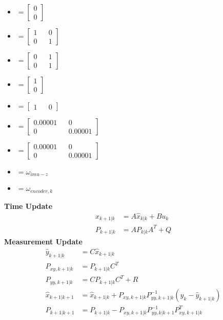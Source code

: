 \documentclass[12pt,a4paper]{article}
\begin{document}
	\begin{itemize}
		\item { 
			\(= \begin{bmatrix}
				0 \\
				0
			\end{bmatrix}\)}
		\item {
			\(= \begin{bmatrix}
				1 && 0\\
				0 && 1
			\end{bmatrix}\)}
		\item { 
			\(= \begin{bmatrix}
				0 && 1\\
				0 && 1
			\end{bmatrix}\)}
		\item { 
			\(= \begin{bmatrix}
				1\\
				0
			\end{bmatrix}\)}
		\item { 
			\(= \begin{bmatrix}
				1 && 0
			\end{bmatrix}\)}
		\item { 
			\(= \begin{bmatrix}
				0.00001 && 0 \\
				0 && 0.00001
			\end{bmatrix}\)}
		\item { 
			\(= \begin{bmatrix}
				0.00001 && 0 \\
				0 && 0.00001
			\end{bmatrix}\)}
		\item { \(= \omega_{imu-z}\)}
		\item { \(= \omega_{encoder,k}\)}
	\end{itemize}
	\textbf{Time Update} \\
	\[
	\begin{split}
		\hat{x}_{k+1|k} &= A\hat{x}_{k|k} + Bu_k \\
		P_{k+1|k} &= AP_{k|k}A^T + Q
	\end{split}
	\]
	\textbf{Measurement Update} \\
	\[
	\begin{split}
		\hat{y}_{k+1|k} &= C\hat{x}_{k+1|k} \\
		P_{xy,k+1|k} &= P_{k+1|k}C^T  \\
		P_{yy,k+1|k} &= CP_{k+1|k}C^T + R \\
		\hat{x}_{k+1|k+1} &= \hat{x}_{k+1|k} + P_{xy,k+1|k}P^{-1}_{yy,k+1|k}(y_k - \hat{y}_{k+1|k}) \\
		P_{k+1|k+1} &= P_{k+1|k} - P_{xy,k+1|k}P^{-1}_{yy,k|k+1}P^T_{xy,k+1|k}
	\end{split}
	\]
	
\end{document}
